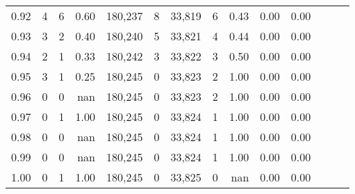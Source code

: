 \begin{tabular}{rrrrrrrrrrrrrr}
0.92 &      4 &      6 &  0.60 &  180,237 &        8 &  33,819 &       6 &  0.43 &  0.00 &      0.00 \\
0.93 &      3 &      2 &  0.40 &  180,240 &        5 &  33,821 &       4 &  0.44 &  0.00 &      0.00 \\
0.94 &      2 &      1 &  0.33 &  180,242 &        3 &  33,822 &       3 &  0.50 &  0.00 &      0.00 \\
0.95 &      3 &      1 &  0.25 &  180,245 &        0 &  33,823 &       2 &  1.00 &  0.00 &      0.00 \\
0.96 &      0 &      0 &   nan &  180,245 &        0 &  33,823 &       2 &  1.00 &  0.00 &      0.00 \\
0.97 &      0 &      1 &  1.00 &  180,245 &        0 &  33,824 &       1 &  1.00 &  0.00 &      0.00 \\
0.98 &      0 &      0 &   nan &  180,245 &        0 &  33,824 &       1 &  1.00 &  0.00 &      0.00 \\
0.99 &      0 &      0 &   nan &  180,245 &        0 &  33,824 &       1 &  1.00 &  0.00 &      0.00 \\
1.00 &      0 &      1 &  1.00 &  180,245 &        0 &  33,825 &       0 &   nan &  0.00 &      0.00 \\
\bottomrule
\end{tabular}
